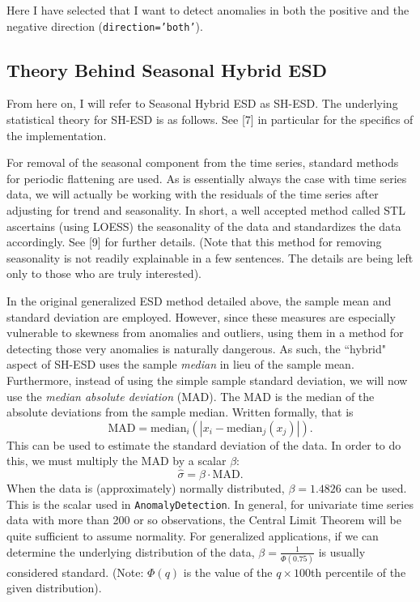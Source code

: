 \documentclass[12pt]{article}
\begin{document}
Here I have selected that I want to detect anomalies in both the positive and the negative direction (\texttt{direction='both'}). 


\subsection{Theory Behind Seasonal Hybrid ESD} From here on, I will refer to Seasonal Hybrid ESD as SH-ESD. The underlying statistical theory for SH-ESD is as follows. See [7] in 
particular for the  specifics of the implementation.

For removal of the seasonal component from the time series, standard methods for periodic flattening are used. As is essentially always the case with time series data, we will actually be working with the residuals of the time series after adjusting for trend and seasonality. In short, a well accepted method called STL ascertains (using LOESS) the seasonality of the data and standardizes the data accordingly. See [9] for further details. (Note that this method for removing seasonality is not readily explainable in a few sentences. The details are being left only to those who are truly interested).  

In the original generalized ESD method detailed above, the sample mean and standard deviation are employed. However, since these measures are especially vulnerable 
to skewness from anomalies and outliers, using them in a method for detecting those very anomalies is naturally dangerous. As such, the ``hybrid" aspect of SH-ESD uses the sample 
\emph{median} in lieu of the sample mean. Furthermore, instead of using the simple sample standard deviation, we will now use the \emph{median absolute deviation} (MAD). The MAD is the 
median of the absolute deviations from the sample median. Written formally, that is 
\[\text{MAD} = \text{median}_i\left(|x_i - \text{median}_j(x_j)|\right).\]
This can be used to estimate the standard deviation of the data. In order to do this, we must multiply the MAD by a scalar $\beta$:
\[\hat{\sigma} = \beta \cdot \text{MAD}.\] When the data is (approximately) normally distributed, $\beta = 1.4826$ can be used. This is the scalar used in \texttt{AnomalyDetection}. In general, for univariate time series data with more than 200 or so observations, the Central Limit Theorem will be quite sufficient to assume normality. For generalized applications, if we can determine the underlying distribution of the data, $\beta = \frac{1}{\Phi(0.75)}$ is usually considered standard. (Note: $\Phi(q)$ is the value of the $q\times 100$th percentile of the given distribution). 
\end{document}

